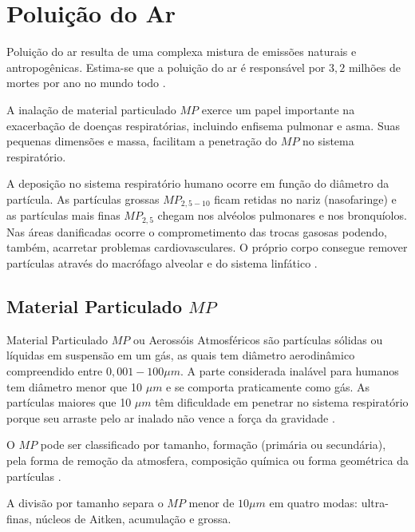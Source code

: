 \section{Poluição do Ar}

Poluição do ar resulta de uma complexa mistura de emissões naturais e 
antropogênicas. Estima-se que a poluição do ar é responsável por 
$3,2$ milhões de mortes por ano no mundo todo \citep{lim2013}.

A inalação de material particulado $MP$ exerce um papel importante na 
exacerbação de doenças respiratórias, incluindo enfisema pulmonar e asma. 
Suas pequenas dimensões e massa, facilitam a penetração do $MP$ no sistema 
respiratório. 

A deposição no sistema respiratório humano ocorre em função do diâmetro da 
partícula.
As partículas grossas $MP_{2,5-10}$ ficam retidas no nariz (nasofaringe) e
as partículas mais finas $MP_{2,5}$ chegam nos alvéolos pulmonares e 
nos bronquíolos.
Nas áreas danificadas ocorre o comprometimento das trocas gasosas podendo, 
também, acarretar problemas cardiovasculares.
O próprio corpo consegue remover partículas através do macrófago alveolar 
e do sistema linfático \citep{arbex2012}.


\subsection{Material Particulado $MP$}

Material Particulado $MP$ ou Aerossóis Atmosféricos são partículas
sólidas ou líquidas em suspensão em um gás, as quais tem diâmetro 
aerodinâmico compreendido  entre $0,001-100\mu m$. 
A parte considerada inalável para humanos tem diâmetro menor que 10 $\mu m$
e se comporta praticamente como gás.
As partículas maiores que 10 $\mu m$ têm dificuldade em penetrar 
no sistema respiratório porque seu arraste pelo ar inalado não vence 
a força da gravidade \citep{seinfeld1998}.

O $MP$ pode ser classificado por tamanho, formação 
(primária ou secundária), pela forma de remoção da atmosfera, 
composição química ou forma geométrica da partículas \citep{seinfeld1998}.

A divisão por tamanho separa o $MP$ menor de $10 \mu m$ em quatro modas:
ultra-finas, núcleos de Aitken, acumulação e grossa. 

